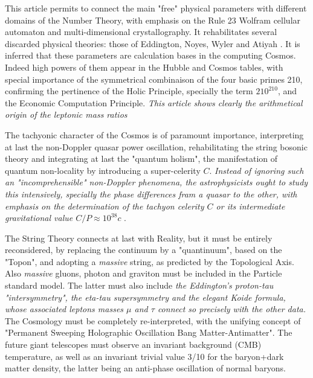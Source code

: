 \documentclass[a4paper,9pt]{article}
\begin{document}
This article permits to connect the main "free" physical parameters with different domains of the Number Theory, with emphasis on the Rule 23 Wolfram cellular automaton and multi-dimensional crystallography. It rehabilitates several discarded physical theories: those of Eddington\cite{Eddington}, Noyes\cite{Noyes}, Wyler\cite{Wyler} and Atiyah \cite{Atiyah}. It is inferred that these parameters are calculation bases in the computing Cosmos. Indeed high powers of them appear in the Hubble and Cosmos tables, with special importance of the symmetrical combinaison of the four basic primes 210, confirming the pertinence of the Holic Principle, specially the term $210^{210}$, and the Economic Computation Principle. \textit {This article shows clearly the arithmetical origin of the leptonic mass ratios}

The tachyonic character of the Cosmos is of paramount importance, interpreting at last the non-Doppler quasar power oscillation, rehabilitating the string bosonic theory and integrating at last the "quantum holism", the manifestation of quantum non-locality by introducing a super-celerity $C$. 
\textit{Instead of ignoring such an "incomprehensible" non-Doppler phenomena, the astrophysicists ought to study this intensively, specially the phase differences fram a quasar to the other, with emphasis on the determination of the tachyon celerity $C$ or its intermediate gravitational value $C/P \approx 10^{38}c$} \cite{Sanchez2}. 

The String Theory connects at last with Reality, but it must be entirely reconsidered, by replacing the continuum by a "quantinuum", based on the "Topon", and adopting a \textit{massive} string, as predicted by the Topological Axis. Also \textit{massive} gluons, photon and graviton must be included in the Particle standard model. The latter must also include \textit{the Eddington's proton-tau "intersymmetry", the eta-tau supersymmetry and the elegant \textit{Koide formula}, whose associated leptons masses $\mu$ and $\tau $ connect so precisely with the other data.} The Cosmology must be completely re-interpreted, with the unifying concept of "Permanent Sweeping Holographic Oscillation Bang Matter-Antimatter". The future giant telescopes must observe an invariant background (CMB) temperature, as well as an invariant trivial value 3/10 \cite{Sanchez2} for the baryon+dark matter density, the latter being an anti-phase oscillation of normal baryons.
\end{document}
